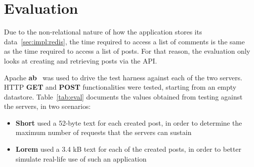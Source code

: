 \section{\label{sec:eval}Evaluation}

Due to the non-relational nature of how the application stores its data~\ref{sec:impl:redis}, the time required to access a list of comments is the same as the time required to access a list of posts. For that reason, the evaluation only looks at creating and retrieving posts via the API.

Apache \textbf{ab}~\cite{ab} was used to drive the test harness against each of the two servers. HTTP \textbf{GET} and \textbf{POST} functionalities were tested, starting from an empty datastore. Table~\ref{tab:eval} documents the values obtained from testing against the servers, in two scenarios:

\begin{itemize}
    \item \textbf{Short} used a 52-byte text for each created post, in order to determine the maximum number of requests that the servers can sustain
    \item \textbf{Lorem} used a 3.4 kB text for each of the created posts, in order to better simulate real-life use of such an application
\end{itemize}

